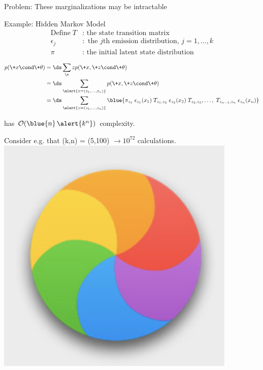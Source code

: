 \documentclass[10pt]{beamer}
\begin{document}
\begin{frame}{Problem:  These marginalizations may be intractable}

 
\begin{block}{Example: Hidden Markov Model}
\begin{align*}
\text{Define} \; T &: \text{ the state transition matrix} \\
\epsilon_j &: \text{ the $j$th emission distribution, $j=1,...,k$} \\
\pi &: \text{ the initial latent state distribution}
\end{align*}


\begin{align*}
p(\+x \cond \+\theta) &= \ds\sum_\+z p(\+x, \+z \cond \+\theta) \\
&= \ds\sum_{ \alert{z=(z_1,\hdots, z_n)}} p(\+x, \+z \cond \+\theta) \\
&= \ds\sum_{ \alert{z=(z_1,\hdots, z_n)}} { \blue{\pi_{z_1} \; \epsilon_{z_1}(x_1) \; T_{z_1,z_2} \; \epsilon_{z_2} (x_2) \; T_{z_2, z_3}, \hdots, \; T_{z_{n-1}, z_n} \; \epsilon_{z_n}(x_n)}}
\end{align*}

has $\mathcal{O}(\blue{n} \, \alert{k^n})$ complexity.  \warning 
\end{block}

Consider e.g. that (k,n) = (5,100) $ \rightarrow 10^{72}$ calculations.  \includegraphics[height=.05\textheight]{images/spinning_wheel.png}

\end{frame}
\end{document}
